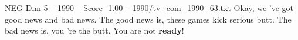 \begin{textsample}{NEG Dim 5 – 1990 – Score -1.00 – 1990/tv\_com\_1990\_63.txt}  \label{ex:f5_neg_080}
Okay, we 've got good news and bad news.
The good news is, these games kick serious butt.
The bad news is, you 're the butt.
You are not \textbf{ready}!

\end{textsample}

